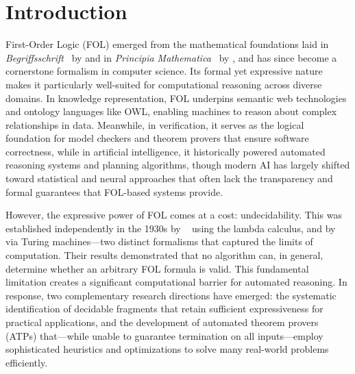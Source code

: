 \newpage\pagestyle{introduction}


\chapter*{Introduction}

First-Order Logic (FOL) emerged from the mathematical foundations laid in \textit{Begriffsschrift}~\cite{frege1879} by \citeauthor{frege1879} and in \textit{Principia Mathematica}~\cite{russell1910} by \citeauthor{russell1910}, and has since become a cornerstone formalism in computer science.
Its formal yet expressive nature makes it particularly well-suited for computational reasoning across diverse domains.
In knowledge representation, FOL underpins semantic web technologies and ontology languages like OWL, enabling machines to reason about complex relationships in data.
Meanwhile, in verification, it serves as the logical foundation for model checkers and theorem provers that ensure software correctness, while in artificial intelligence, it historically powered automated reasoning systems and planning algorithms, though modern AI has largely shifted toward statistical and neural approaches that often lack the transparency and formal guarantees that FOL-based systems provide.

However, the expressive power of FOL comes at a cost: undecidability.
This was established independently in the 1930s by \citeauthor{church1936}~\cite{church1936} using the lambda calculus, and by \citeauthor{turing1936}~\cite{turing1936} via Turing machines---two distinct formalisms that captured the limits of computation.
Their results demonstrated that no algorithm can, in general, determine whether an arbitrary FOL formula is valid. This fundamental limitation creates a significant computational barrier for automated reasoning.
In response, two complementary research directions have emerged: the systematic identification of decidable fragments that retain sufficient expressiveness for practical applications, and the development of automated theorem provers (ATPs) that---while unable to guarantee termination on all inputs---employ sophisticated heuristics and optimizations to solve many real-world problems efficiently.

